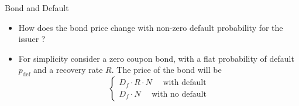 \documentclass{beamer}
\begin{document}
\begin{frame}{Bond and Default}
\begin{itemize}
\item How does the bond price change with non-zero default probability for the issuer ?
\item For simplicity consider a zero coupon bond, with a flat probability of default $p_{\text{def}}$ and a recovery rate $R$.
The price of the bond will be
\begin{equation*}
\begin{cases}
D_f\cdot R \cdot N\quad\text{ with default} \\
D_f\cdot N\quad \text{ with no default}
\end{cases}
\end{equation*}
\end{itemize}
\end{frame}
\end{document}
